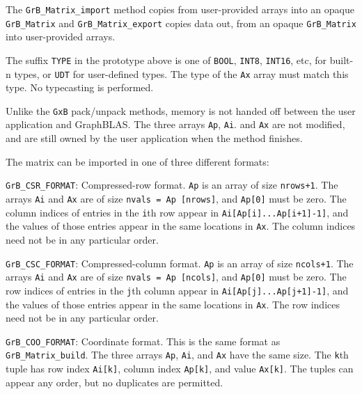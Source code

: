\documentclass[12pt]{article}
\newenvironment{packed_itemize}{
\begin{itemize}
  \setlength{\itemsep}{1pt}
  \setlength{\parskip}{0pt}
  \setlength{\parsep}{0pt}
}{\end{itemize}}
\begin{document}
{The \verb'GrB_Matrix_import' method copies from user-provided arrays into an
opaque \verb'GrB_Matrix' and \verb'GrB_Matrix_export' copies data out, from an
opaque \verb'GrB_Matrix' into user-provided arrays.

The suffix \verb'TYPE' in the prototype above is one of \verb'BOOL',
\verb'INT8', \verb'INT16', etc, for built-n types, or \verb'UDT' for
user-defined types.  The type of the \verb'Ax' array must match this type.  No
typecasting is performed.

Unlike the \verb'GxB'
pack/unpack methods, memory is not handed off between the user application
and GraphBLAS.   The three arrays \verb'Ap', \verb'Ai'.  and \verb'Ax' are not
modified, and are still owned by the user application when the method finishes.

The matrix can be imported in one of three different formats:

\begin{packed_itemize}
    \item \verb'GrB_CSR_FORMAT': %
        Compressed-row format.  \verb'Ap' is an array of size \verb'nrows+1'.
        The arrays \verb'Ai' and \verb'Ax' are of size \verb'nvals = Ap [nrows]',
        and \verb'Ap[0]' must be zero.
        The column indices of entries in the \verb'i'th row appear in
        \verb'Ai[Ap[i]...Ap[i+1]-1]', and the values of those entries appear in
        the same locations in \verb'Ax'.
        The column indices need not be in any particular order.

    \item \verb'GrB_CSC_FORMAT': %
        Compressed-column format.  \verb'Ap' is an array of size \verb'ncols+1'.
        The arrays \verb'Ai' and \verb'Ax' are of size \verb'nvals = Ap [ncols]',
        and \verb'Ap[0]' must be zero.
        The row indices of entries in the \verb'j'th column appear in
        \verb'Ai[Ap[j]...Ap[j+1]-1]', and the values of those entries appear in
        the same locations in \verb'Ax'.
        The row indices need not be in any particular order.
        
    \item \verb'GrB_COO_FORMAT': %
        Coordinate format.  This is the same format as \newline
        \verb'GrB_Matrix_build'.
        The three arrays \verb'Ap', \verb'Ai', and \verb'Ax' have the same
        size.  The \verb'k'th tuple has row index \verb'Ai[k]',
        column index \verb'Ap[k]', and value \verb'Ax[k]'.  The tuples can
        appear any order, but no duplicates are permitted.


\end{packed_itemize}}
\end{document}
